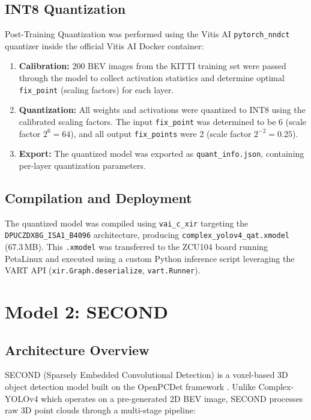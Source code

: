 \documentclass[12pt, a4paper]{report}
\begin{document}
\subsection{INT8 Quantization}

Post-Training Quantization was performed using the Vitis AI \texttt{pytorch\_nndct} quantizer inside the official Vitis AI Docker container:

\begin{enumerate}[nosep]
    \item \textbf{Calibration:} 200 BEV images from the KITTI training set were passed through the model to collect activation statistics and determine optimal \texttt{fix\_point} (scaling factors) for each layer.
    \item \textbf{Quantization:} All weights and activations were quantized to INT8 using the calibrated scaling factors. The input \texttt{fix\_point} was determined to be 6 (scale factor $2^6 = 64$), and all output \texttt{fix\_points} were 2 (scale factor $2^{-2} = 0.25$).
    \item \textbf{Export:} The quantized model was exported as \texttt{quant\_info.json}, containing per-layer quantization parameters.
\end{enumerate}

\subsection{Compilation and Deployment}

The quantized model was compiled using \texttt{vai\_c\_xir} targeting the \texttt{DPUCZDX8G\_ISA1\_B4096} architecture, producing \texttt{complex\_yolov4\_qat.xmodel} (67.3\,MB). This \texttt{.xmodel} was transferred to the ZCU104 board running PetaLinux and executed using a custom Python inference script leveraging the VART API (\texttt{xir.Graph.deserialize}, \texttt{vart.Runner}).


\section{Model 2: SECOND}

\subsection{Architecture Overview}

SECOND (Sparsely Embedded Convolutional Detection) \cite{second2018} is a voxel-based 3D object detection model built on the OpenPCDet framework \cite{openpcdet2020}. Unlike Complex-YOLOv4 which operates on a pre-generated 2D BEV image, SECOND processes raw 3D point clouds through a multi-stage pipeline:
\end{document}
